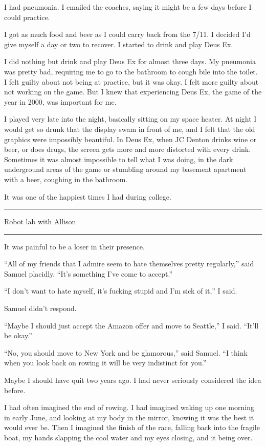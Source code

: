 I had pneumonia.  I emailed the coaches, saying it might be a few days before I
could practice.

I got as much food and beer as I could carry back from the 7/11.  I decided I'd
give myself a day or two to recover.  I started to drink and play Deus Ex.  

I did nothing but drink and play Deus Ex for almost three days.  My pneumonia
was pretty bad, requiring me to go to the bathroom to cough bile into the
toilet.  I felt guilty about not being at practice, but it was okay.  I felt
more guilty about not working on the game.  But I knew that experiencing Deus
Ex, the game of the year in 2000, was important for me.

I played very late into the night, basically sitting on my space heater.  At
night I would get so drunk that the display swam in front of me, and I felt that
the old graphics were impossibly beautiful.  In Deus Ex, when JC Denton drinks
wine or beer, or does drugs, the screen gets more and more distorted with every
drink.  Sometimes it was almost impossible to tell what I was doing, in the dark
underground areas of the game or stumbling around my basement apartment with a
beer, coughing in the bathroom.

It was one of the happiest times I had during college.

\plainfancybreak{12pt}{2}{* * *}

Robot lab with Allison

\plainfancybreak{12pt}{2}{* * *}

It was painful to be a loser in their presence.  

``All of my friends that I admire seem to hate themselves pretty regularly,''
said Samuel placidly.  ``It's something I've come to accept.''

``I don't want to hate myself, it's fucking stupid and I'm sick of it,'' I said.  

Samuel didn't respond.

``Maybe I should just accept the Amazon offer and move to Seattle,'' I said.
``It'll be okay.''

``No, you should move to New York and be glamorous,'' said Samuel.  ``I think
when you look back on rowing it will be very indistinct for you.'' 

Maybe I should have quit two years ago.  I had never seriously considered the
idea before.

I had often imagined the end of rowing.  I had imagined waking up one morning in
early June, and looking at my body in the mirror, knowing it was the best it
would ever be.  Then I imagined  the finish of the race, falling back into the
fragile boat, my hands slapping the cool water and my eyes closing, and it being
over.

